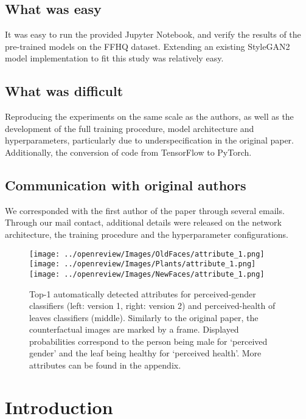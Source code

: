 \subsection*{What was easy}

It was easy to run the provided Jupyter Notebook, and verify the results of the pre-trained models on the FFHQ dataset. Extending an existing StyleGAN2 model implementation to fit this study was relatively easy.


\subsection*{What was difficult}

Reproducing the experiments on the same scale as the authors, as well as the development of the full training procedure, model architecture and hyperparameters, particularly due to underspecification in the original paper. Additionally, the conversion of code from TensorFlow to PyTorch.


\subsection*{Communication with original authors}

We corresponded with the first author of the paper through several emails. Through our mail contact, additional details were released on the network architecture, the training procedure and the hyperparameter configurations.

\clearpage

\begin{figure}[!htb]
  \texttt{[image: ../openreview/Images/OldFaces/attribute\_1.png]}
\endminipage\hfill
{}
  \texttt{[image: ../openreview/Images/Plants/attribute\_1.png]}
\endminipage\hfill
{}
  \texttt{[image: ../openreview/Images/NewFaces/attribute\_1.png]}
\endminipage\hfill
\caption{Top-1 automatically detected attributes for perceived-gender classifiers (left: version 1, right: version 2) and perceived-health of leaves classifiers (middle). Similarly to the original paper, the counterfactual images are marked by a frame. Displayed probabilities correspond to the person being male for `perceived gender' and the leaf being healthy for `perceived health'. More attributes can be found in the appendix.}
\end{figure}


\section{Introduction}

